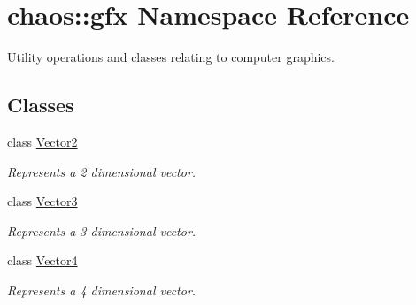 \hypertarget{namespacechaos_1_1gfx}{}\section{chaos\+:\+:gfx Namespace Reference}
\label{namespacechaos_1_1gfx}


Utility operations and classes relating to computer graphics.  


\subsection*{Classes}
\begin{DoxyCompactItemize}
\item 
class \hyperlink{classchaos_1_1gfx_1_1_vector2}{Vector2}
\begin{DoxyCompactList}\small\item\em Represents a 2 dimensional vector. \end{DoxyCompactList}\item 
class \hyperlink{classchaos_1_1gfx_1_1_vector3}{Vector3}
\begin{DoxyCompactList}\small\item\em Represents a 3 dimensional vector. \end{DoxyCompactList}\item 
class \hyperlink{classchaos_1_1gfx_1_1_vector4}{Vector4}
\begin{DoxyCompactList}\small\item\em Represents a 4 dimensional vector. \end{DoxyCompactList}\end{DoxyCompactItemize}

